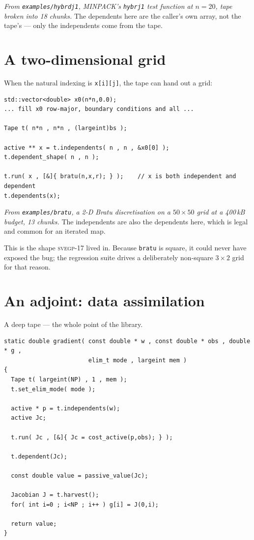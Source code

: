 \documentclass[11pt,a4paper]{report}
\newcommand{\svegp}[1]{\textsc{svegp-#1}}
\newcommand{\code}[1]{\texttt{#1}}
\begin{document}
\noindent
\emph{From \code{examples/hybrdj1}, MINPACK's \code{hybrj1} test function at
$n=20$, tape broken into 18 chunks.} The dependents here are the caller's own
array, not the tape's --- only the independents come from the tape.

\section{A two-dimensional grid}

When the natural indexing is \code{x[i][j]}, the tape can hand out a grid:

\begin{lstlisting}
std::vector<double> x0(n*n,0.0);
... fill x0 row-major, boundary conditions and all ...

Tape t( n*n , n*n , (largeint)bs );

active ** x = t.independents( n , n , &x0[0] );
t.dependent_shape( n , n );

t.run( x , [&]{ bratu(n,x,r); } );    // x is both independent and dependent
t.dependents(x);
\end{lstlisting}

\noindent
\emph{From \code{examples/bratu}, a 2-D Bratu discretisation on a $50\times50$
grid at a 400\,kB budget, 13 chunks.} The independents are also the dependents
here, which is legal and common for an iterated map.

This is the shape \svegp{17} lived in. Because \code{bratu} is square, it could
never have exposed the bug; the regression suite drives a deliberately
non-square $3\times2$ grid for that reason.

\section{An adjoint: data assimilation}

A deep tape --- the whole point of the library.

\begin{lstlisting}
static double gradient( const double * w , const double * obs , double * g ,
                        elim_t mode , largeint mem )
{
  Tape t( largeint(NP) , 1 , mem );
  t.set_elim_mode( mode );

  active * p = t.independents(w);
  active Jc;

  t.run( Jc , [&]{ Jc = cost_active(p,obs); } );

  t.dependent(Jc);

  const double value = passive_value(Jc);

  Jacobian J = t.harvest();
  for( int i=0 ; i<NP ; i++ ) g[i] = J(0,i);

  return value;
}
\end{lstlisting}
\end{document}
